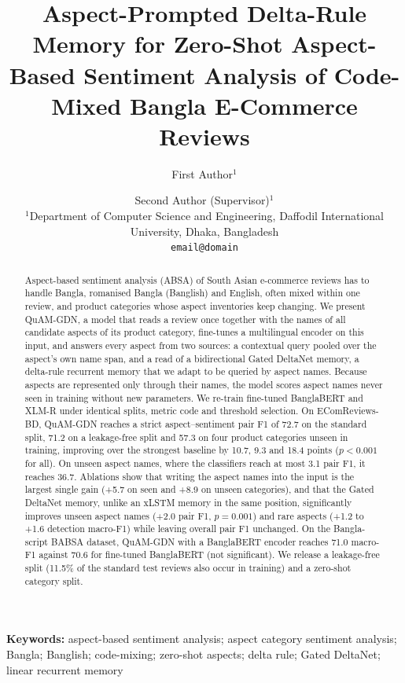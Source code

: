 \documentclass[11pt]{article}
\title{Aspect-Prompted Delta-Rule Memory for Zero-Shot Aspect-Based Sentiment Analysis of
Code-Mixed Bangla E-Commerce Reviews}
\author{First Author$^{1}$ \and Second Author (Supervisor)$^{1}$\\[2pt]
\small $^{1}$Department of Computer Science and Engineering, Daffodil International University, Dhaka, Bangladesh\\
\small \texttt{email@domain}}
\date{}
\newcommand{\quam}{QuAM-GDN}
\begin{document}
\maketitle

\begin{abstract}
Aspect-based sentiment analysis (ABSA) of South Asian e-commerce reviews has to handle Bangla,
romanised Bangla (Banglish) and English, often mixed within one review, and product categories whose
aspect inventories keep changing. We present \quam{}, a model that reads a review once together with
the names of all candidate aspects of its product category, fine-tunes a multilingual encoder on this
input, and answers every aspect from two sources: a contextual query pooled over the aspect's own name
span, and a read of a bidirectional Gated DeltaNet memory, a delta-rule recurrent memory that we
adapt to be queried by aspect names. Because aspects are represented only through their names, the
model scores aspect names never seen in training without new parameters. We re-train fine-tuned
BanglaBERT and XLM-R under identical splits, metric code and threshold selection. On EComReviews-BD,
\quam{} reaches a strict aspect--sentiment pair F1 of 72.7 on the standard split, 71.2 on a
leakage-free split and 57.3 on four product categories unseen in training, improving over the
strongest baseline by 10.7, 9.3 and 18.4 points ($p<0.001$ for all). On unseen aspect names, where
the classifiers reach at most 3.1 pair F1, it reaches 36.7. Ablations show that writing the aspect
names into the input is the largest single gain (+5.7 on seen and +8.9 on unseen categories), and
that the Gated DeltaNet memory, unlike an xLSTM memory in the same position, significantly improves
unseen aspect names (+2.0 pair F1, $p=0.001$) and rare aspects (+1.2 to +1.6 detection macro-F1)
while leaving overall pair F1 unchanged. On the Bangla-script BABSA dataset, \quam{} with a BanglaBERT
encoder reaches 71.0 macro-F1 against 70.6 for fine-tuned BanglaBERT (not significant). We release a
leakage-free split (11.5\% of the standard test reviews also occur in training) and a zero-shot
category split.
\end{abstract}

\noindent\textbf{Keywords:} aspect-based sentiment analysis; aspect category sentiment analysis;
Bangla; Banglish; code-mixing; zero-shot aspects; delta rule; Gated DeltaNet; linear recurrent memory

\end{document}

